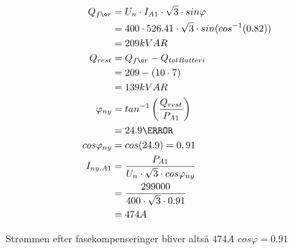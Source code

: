 {\begin{align*}\\
Q_{før} &= U_{n} \cdot I_{A1} \cdot \sqrt{3} \cdot sin \varphi\\
		&= 400 \cdot 526.41 \cdot \sqrt{3} \cdot sin(cos^{-1}(0.82))\\
		&= 209kVAR\\
Q_{rest} &= Q_{før} - Q_{totBatteri}\\
		&= 209 - (10 \cdot 7)\\
		&= 139kVAR\\
\varphi_{ny}		&= tan^{-1}\left(\frac{Q_{rest}}{P_{A1}}\right)\\
					&= 24.9 \degree\\
cos \varphi_{ny} &= cos(24.9) = 0,91\\
I_{ny,A1} &= \frac{P_{A1}}{U_{n} \cdot \sqrt{3} \cdot cos \varphi_{ny}}\\
			&= \frac{299000}{400 \cdot \sqrt{3} \cdot 0.91}\\
			&= 474A
\end{align*}

Strømmen efter fasekompenseringer bliver altså $474 A$ $cos \varphi = 0.91$
}


